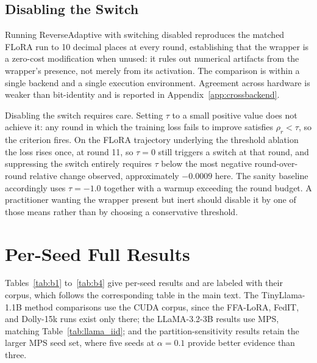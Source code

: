 \documentclass[iicol,pdflatex,sn-mathphys-num]{sn-jnl}
\begin{document}
\begin{appendices}
\subsection{Disabling the Switch}
\label{app:noswitch}
Running ReverseAdaptive with switching disabled reproduces the matched FLoRA \cite{wang2024flora} run to 10 decimal places at every round, establishing that the wrapper is a zero-cost modification when unused: it rules out numerical artifacts from the wrapper's presence, not merely from its activation. The comparison is within a single backend and a single execution environment. Agreement across hardware is weaker than bit-identity and is reported in Appendix~\ref{app:crossbackend}.

Disabling the switch requires care. Setting $\tau$ to a small positive value does not achieve it: any round in which the training loss fails to improve satisfies $\rho_r < \tau$, so the criterion fires. On the FLoRA trajectory underlying the threshold ablation the loss rises once, at round 11, so $\tau{=}0$ still triggers a switch at that round, and suppressing the switch entirely requires $\tau$ below the most negative round-over-round relative change observed, approximately ${-}0.0009$ here. The sanity baseline accordingly uses $\tau{=}{-}1.0$ together with a warmup exceeding the round budget. A practitioner wanting the wrapper present but inert should disable it by one of those means rather than by choosing a conservative threshold.

\section{Per-Seed Full Results}
\label{app:perseed}
Tables~\ref{tab:b1} to~\ref{tab:b4} give per-seed results and are labeled with their corpus, which follows the corresponding table in the main text. The TinyLlama-1.1B method comparisons use the CUDA corpus, since the FFA-LoRA, FedIT, and Dolly-15k runs exist only there; the LLaMA-3.2-3B results use MPS, matching Table~\ref{tab:llama_iid}; and the partition-sensitivity results retain the larger MPS seed set, where five seeds at $\alpha{=}0.1$ provide better evidence than three.


\end{appendices}
\end{document}
